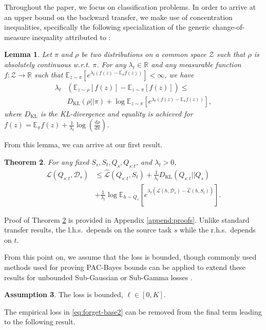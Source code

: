 \documentclass{article}
\theoremstyle{plain}
\newtheorem{theorem}{Theorem}[section]
\newtheorem{lemma}[theorem]{Lemma}
\theoremstyle{definition}
\newtheorem{assumption}[theorem]{Assumption}
\theoremstyle{remark}
\begin{document}
Throughout the paper, we focus on classification problems.
In order to arrive at an upper bound on the backward transfer, we make use of concentration inequalities, specifically the following specialization of the generic change-of-measure inequality attributed to \citet{donsker1975large}:

\begin{lemma} \label{lemma:concentration} \cite{shui2020beyond} Let $\pi$ and $\rho$ be two distributions on a common space $\mathcal{Z}$ such that $\rho$ is absolutely continuous w.\!r.\!t.\! $\pi$. For any $\lambda_t\in \mathbb{R}$ and any measurable function $f:\mathcal{Z}\rightarrow \mathbb{R}$ such that $\mathbb{E}_{z\sim \pi}\left [e^{\lambda_t(f(z)-\mathbb{E}_\pi f(z))} \right ]<\infty$, we have
%
	\begin{equation}
 \begin{split}
	\lambda_t&\left ( \mathbb{E}_{z\sim \rho}\left [f(z) \right ]-\mathbb{E}_{z\sim \pi}\left [f(z) \right ] \right ) \leq \\
 &D_{\mathrm{KL}}(\rho||\pi)+ \log\mathbb{E}_{z\sim \pi}\left [e^{\lambda_t(f(z)-\mathbb{E}_\pi f(z))} \right ],
 \end{split}
	\end{equation}	
	where $D_{\mathrm{KL}}$ is the KL-divergence and equality is achieved for $f(z)=\mathbb{E}_\pi f(z)+\frac{1}{\lambda_t}\log(\frac{d\rho}{d\pi})$.
\end{lemma}

From this lemma, we can arrive at our first result.
%
\begin{theorem} \label{thm:forget-base2}
    For any fixed $S_s,S_t,Q_s,Q_{s:t}$, and $
    \lambda_t>0$, 
    \begin{align} \label{eq:forget-base2}
\mathcal{L}(Q_{s:t}, \mathcal{D}_s) &\leq \hat{\mathcal{L}}(Q_{s:t}, S_t) + \frac{1}{\lambda_t} D_{\mathrm{KL}}(Q_{s:t}||Q_{s})\\
&+\frac{1}{\lambda_t}\log\mathbb{E}_{h\sim Q_{s}}\left [e^{\lambda_t(\mathcal{L}(h,\mathcal{D}_s)-\hat{\mathcal{L}}(h,S_t))} \right ].\nonumber
\end{align}
\end{theorem}
Proof of Theorem \ref{thm:forget-base2} is provided in Appendix \ref{append:proofs}. 
Unlike standard transfer results, the l.h.s.\ depends on the source task $s$ while the r.h.s.\ depends on $t$.

From this point on, we assume that the loss is bounded, though commonly used methods used for proving PAC-Bayes bounds can be applied to extend these results for unbounded Sub-Gaussian or Sub-Gamma losses \citep{alquier2016properties, alquier2021user}.
\begin{assumption}
The loss is bounded, $\ell\in [0, K].$
\end{assumption}
The empirical loss in \eqref{eq:forget-base2} can be removed from the final term leading to the following result.
\end{document}
